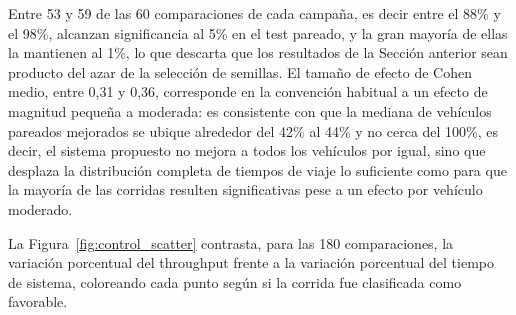 \begin{table}[htbp]
\renewcommand{\arraystretch}{1.3}
\caption{Rigor estadístico por campaña: corridas significativas (de 60), tamaño de
efecto medio y mediana del porcentaje de vehículos pareados mejorados}
\label{tab:control_rigor}
\centering
\footnotesize
{}
\end{table}

Entre 53 y 59 de las 60 comparaciones de cada campaña, es decir entre el 88\% y el 98\%,
alcanzan significancia al 5\% en el test pareado, y la gran mayoría de ellas la
mantienen al 1\%, lo que descarta que los resultados de la Sección anterior sean producto
del azar de la selección de semillas. El tamaño de efecto de Cohen medio, entre 0,31 y
0,36, corresponde en la convención habitual a un efecto de magnitud pequeña a moderada:
es consistente con que la mediana de vehículos pareados mejorados se ubique alrededor
del 42\% al 44\% y no cerca del 100\%, es decir, el sistema propuesto no mejora a todos
los vehículos por igual, sino que desplaza la distribución completa de tiempos de viaje
lo suficiente como para que la mayoría de las corridas resulten significativas pese a un
efecto por vehículo moderado.

La Figura~\ref{fig:control_scatter} contrasta, para las 180 comparaciones, la variación
porcentual del throughput frente a la variación porcentual del tiempo de sistema,
coloreando cada punto según si la corrida fue clasificada como favorable.


